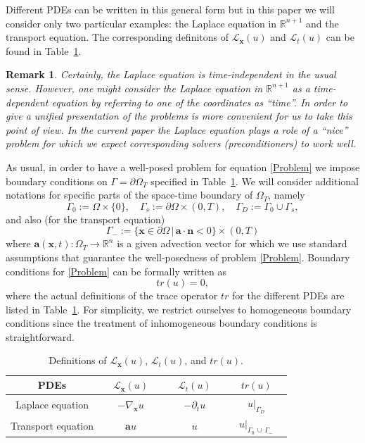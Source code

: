 \documentclass[a4paper,12pt]{amsart}
\numberwithin{equation}{section}
\newtheorem{remark}{Remark}[section]
\def\bu{{\mathbf a}} %
\def\bn{{\mathbf n}}
\renewcommand{\L}{{\mathcal L}}
\def\XVec#1{{\mathbf #1}}
\def\Xx{\XVec{x}}
\begin{document}
Different PDEs can be written in this general form but in this paper we will consider only two particular examples: the Laplace equation in $\mathbb{R}^{n+1}$ and the transport equation. The corresponding definitons of $\L_\Xx(u)$ and $\L_t(u)$ can be found  in Table~\ref{tab:PDE_operators}.

\begin{remark}
Certainly, the Laplace equation is time-independent in the usual sense. However, one might consider the Laplace equation in $\mathbb{R}^{n+1}$ as a time-dependent equation by referring to one of the coordinates as ``time''. In order to give a unified presentation of the problems is more convenient for us to take this point of view. In the current paper the Laplace equation plays a role of a ``nice'' problem for which we expect corresponding solvers (preconditioners) to work well.
\end{remark}

As usual, in order to have a well-posed problem for equation \eqref{Problem} we impose boundary conditions on $\Gamma = \partial \Omega_T$ specified in Table~\ref{tab:PDE_operators}. We will consider additional notations for specific parts of the space-time boundary of $\Omega_T$, namely 
\[
\Gamma_0 := \Omega\times\{0\},\quad\Gamma_s := \partial\Omega\times(0, T),\quad\Gamma_D := \Gamma_0\cup\Gamma_s,
\]
and also (for the transport equation)
\[
\Gamma_- := \{\Xx\in\partial\Omega \,|\, \bu\cdot\bn < 0 \}\times(0, T)
\]
where $\bu(\Xx,t) : \Omega_T \rightarrow \mathbb{R}^n$ is a given advection vector for which we use standard assumptions that guarantee the well-posedness \cite{evans} of problem \eqref{Problem}. Boundary conditions for  \eqref{Problem} can be formally written as
\[
tr (u) = 0,
\]
where the actual definitions of the trace operator $tr$ for the different PDEs are listed in Table~\ref{tab:PDE_operators}. For simplicity, we restrict ourselves to homogeneous boundary conditions since the treatment of inhomogeneous boundary conditions is straightforward. 
\begin{table}[h]
\caption{Definitions of $\L_\Xx(u)$, $\L_t(u)$, and $tr(u)$.}
\label{tab:PDE_operators}
\begin{tabular}{ |c||c|c|c|} \hline
PDEs & $\quad \L_\Xx(u) \quad$ & $\quad \L_t(u) \quad$ & $\quad tr(u) \quad$  \\ \hline
Laplace equation & $-\nabla_\Xx u$ & $-\partial_t u$ & $u|_{\Gamma_D}$ \\ \hline
Transport equation & $\bu u$ & $u$ & $u|_{\Gamma_0\,\cup\,\Gamma_-}$   \\ \hline
\end{tabular}
\end{table}
\end{document}
